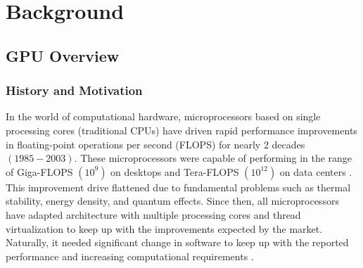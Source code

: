 \chapter{Background}\label{chap:Background}


\section{GPU Overview}\label{GPU-info}
\subsection{History and Motivation}\label{sec:History}
In the world of computational hardware, microprocessors based on single processing cores (traditional CPUs) have driven rapid performance improvements in floating-point operations per second (FLOPS) for nearly 2 decades $(1985-2003)$.
These microprocessors were capable of performing in the range of Giga-FLOPS $(10^9)$ on desktops and Tera-FLOPS $(10^{12})$ on data centers \cite{GPU_book_wen-mei}.
This improvement drive flattened due to fundamental problems such as thermal stability, energy density, and quantum effects.
Since then, all microprocessors have adapted architecture with multiple processing cores and thread virtualization to keep up with the improvements expected by the market. Naturally, it needed significant change in software to keep up with the reported performance and increasing computational requirements \cite{Sutter-multi-core-programming}.

